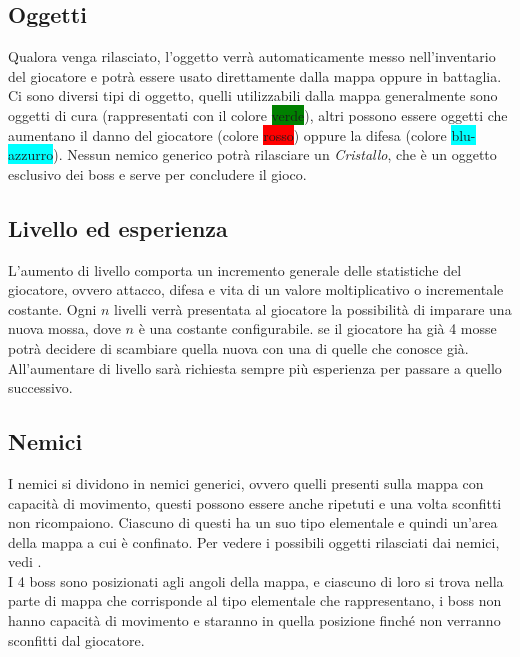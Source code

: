 \documentclass[a4paper,12pt]{report}
\begin{document}
\subsection{Oggetti} \label{ss:oggetti}
Qualora venga rilasciato, l'oggetto verrà automaticamente messo nell'inventario del giocatore e potrà essere usato direttamente dalla mappa oppure in battaglia. Ci sono diversi tipi di oggetto, quelli utilizzabili dalla mappa generalmente sono oggetti di cura (rappresentati con il colore \colorbox{green}{verde}), altri possono essere oggetti che aumentano il danno del giocatore (colore \colorbox{red}{rosso}) oppure la difesa (colore \colorbox{cyan}{blu-azzurro}). Nessun nemico generico potrà rilasciare un \textit{Cristallo}, che è un oggetto esclusivo dei boss e serve per concludere il gioco.

\subsection{Livello ed esperienza}
L'aumento di livello comporta un incremento generale delle statistiche del giocatore, ovvero attacco, difesa e vita di un valore moltiplicativo o incrementale costante. Ogni $\mathit{n}$ livelli verrà presentata al giocatore la possibilità di imparare una nuova mossa, dove $\mathit{n}$ è una costante configurabile. se il giocatore ha già 4 mosse potrà decidere di scambiare quella nuova con una di quelle che conosce già. All'aumentare di livello sarà richiesta sempre più esperienza per passare a quello successivo.

\subsection{Nemici}
I nemici si dividono in nemici generici, ovvero quelli presenti sulla mappa con capacità di movimento, questi possono essere anche ripetuti e una volta sconfitti non ricompaiono. Ciascuno di questi ha un suo tipo elementale e quindi un'area della mappa a cui è confinato.
Per vedere i possibili oggetti rilasciati dai nemici, vedi \textit{}.\\
I 4 boss sono posizionati agli angoli della mappa, e ciascuno di loro si trova nella parte di mappa che corrisponde al tipo elementale che rappresentano, i boss non hanno capacità di movimento e staranno in quella posizione finché non verranno sconfitti dal giocatore.
\end{document}
